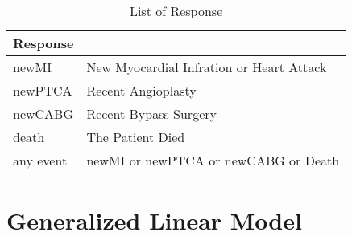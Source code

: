 \documentclass[a4paper,12pt]{article}
\begin{document}
   \begin{table}[htbp]
     \centering
     \caption{List of Response}
       \begin{tabular}{ll}
       \toprule[1.5pt]
       Response &  \\
       \midrule
       newMI & New Myocardial Infration or Heart Attack \\
       newPTCA & Recent Angioplasty \\
       newCABG & Recent Bypass Surgery \\
       death & The Patient Died \\
       any event & newMI or newPTCA or newCABG or Death \\
       \bottomrule[1.5pt]
       \end{tabular}%
     \label{LoR}
   \end{table}%
\section{Generalized Linear Model}
\end{document}
